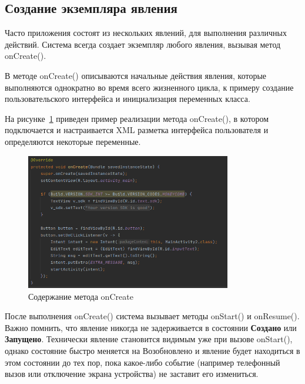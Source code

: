 \subsection{Создание экземпляра явления}
Часто приложения состоят из нескольких явлений, для выполнения
различных действий. Система всегда создает экземпляр любого явления,
вызывая метод onCreate().\par
В методе onCreate() описываются начальные действия явления, которые
выполняются однократно во время всего жизненного цикла, к примеру
создание пользовательского интерфейса и инициализация переменных
класса.\par
На рисунке~\ref{fig:activity:onCreate:content} приведен пример
реализации метода onCreate(), в котором подключается и настраивается XML
разметка интерфейса пользователя и определяются некоторые переменные.
\begin{figure}[h!tp]
	\centering
	\includegraphics[width=0.8\textwidth]{Screenshot from 2023-02-21 11-24-19.png}
	\caption{Содержание метода onCreate}
	\label{fig:activity:onCreate:content}
\end{figure}
После выполнения onCreate() система вызывает методы onStart() и
onResume(). Важно помнить, что явление никогда не задерживается в состоянии
\textbf{Создано} или \textbf{Запущено}. Технически явление становится
видимым уже при вызове onStart(), однако состояние быстро меняется на
Возобновлено и явление будет находиться в этом состоянии до тех пор,
пока какое-либо событие (например телефонный вызов или отключение экрана
устройства) не заставит его измениться.

